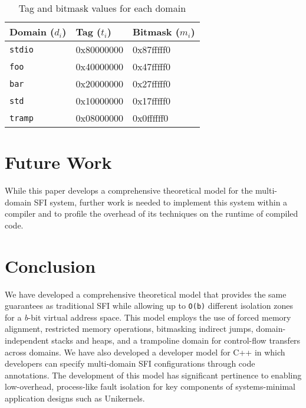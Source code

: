 \documentclass[12pt]{IEEEtran}
\begin{document}
\begin{table}[H]
\captionsetup{justification=centering}
\centering
\begin{tabular}{@{}lll@{}}
\rowcolor[HTML]{EFEFEF} 
\textbf{Domain ($d_i$)} & \textbf{Tag ($t_i$)} & \textbf{Bitmask ($m_i$)} \\ \midrule
\texttt{stdio}          & 0x80000000           & 0x87fffff0               \\
\rowcolor[HTML]{EFEFEF} 
\texttt{foo}            & 0x40000000           & 0x47fffff0               \\
\texttt{bar}            & 0x20000000           & 0x27fffff0               \\
\rowcolor[HTML]{EFEFEF} 
\texttt{std}            & 0x10000000           & 0x17fffff0               \\
\texttt{tramp}          & 0x08000000           & 0x0ffffff0              
\end{tabular}

\caption{Tag and bitmask values for each domain}
\label{tbl:masks}
\end{table}

\section{Future Work}

While this paper develops a comprehensive theoretical model for the multi-domain SFI system, further work is needed to implement this system within a compiler and to profile the overhead of its techniques on the runtime of compiled code.

\section{Conclusion}

We have developed a comprehensive theoretical model that provides the same guarantees as traditional SFI while allowing up to \texttt{O(b)} different isolation zones for a \textit{b}-bit virtual address space. This model employs the use of forced memory alignment, restricted memory operations, bitmasking indirect jumps, domain-independent stacks and heaps, and a trampoline domain for control-flow transfers across domains. We have also developed a developer model for C++ in which developers can specify multi-domain SFI configurations through code annotations. The development of this model has significant pertinence to enabling low-overhead, process-like fault isolation for key components of systems-minimal application designs such as Unikernels.

\medskip
 
\printbibliography
 
\end{document}
